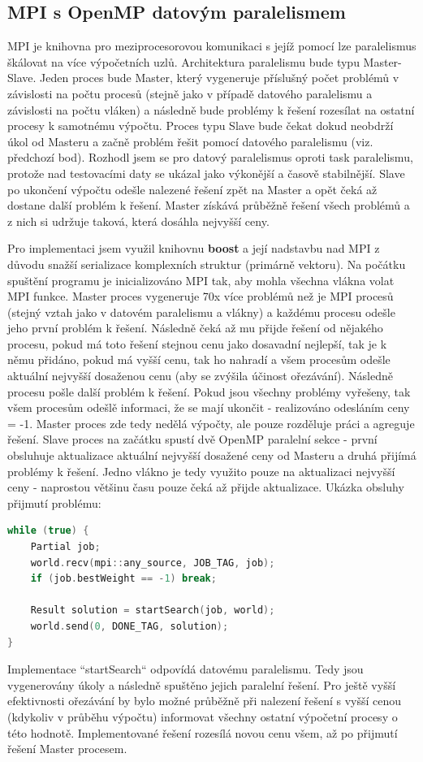 \documentclass{article}%
\begin{document}
\subsection{MPI s OpenMP datovým paralelismem}
MPI je knihovna pro meziprocesorovou komunikaci s jejíž pomocí lze paralelismus škálovat na více výpočetních uzlů. Architektura paralelismu bude typu Master-Slave. Jeden proces bude Master, který vygeneruje příslušný počet problémů v závislosti na počtu procesů (stejně jako v případě datového paralelismu a závislosti na počtu vláken) a následně bude problémy k řešení rozesílat na ostatní procesy k samotnému výpočtu. Proces typu Slave bude čekat dokud neobdrží úkol od Masteru a začně problém řešit pomocí datového paralelismu (viz. předchozí bod). Rozhodl jsem se pro datový paralelismus oproti task paralelismu, protože nad testovacími daty se ukázal jako výkonější a časově stabilnější. Slave po ukončení výpočtu odešle nalezené řešení zpět na Master a opět čeká až dostane další problém k řešení. Master získává průběžně řešení všech problémů a z nich si udržuje taková, která dosáhla nejvyšší ceny.

Pro implementaci jsem využil knihovnu \textbf{boost} a její nadstavbu nad MPI z důvodu snažší serializace komplexních struktur (primárně vektoru). Na počátku spuštění programu je inicializováno MPI tak, aby mohla všechna vlákna volat MPI funkce.
Master proces vygeneruje 70x více problémů než je MPI procesů (stejný vztah jako v datovém paralelismu a vlákny) a každému procesu odešle jeho první problém k řešení. Následně čeká až mu přijde řešení od nějakého procesu, pokud má toto řešení stejnou cenu jako dosavadní nejlepší, tak je k němu přidáno, pokud má vyšší cenu, tak ho nahradí a všem procesům odešle aktuální nejvyšší dosaženou cenu (aby se zvýšila účinost ořezávání). Následně procesu pošle další problém k řešení. Pokud jsou všechny problémy vyřešeny, tak všem procesům odešlě informaci, že se mají ukončit - realizováno odesláním ceny = -1. Master proces zde tedy nedělá výpočty, ale pouze rozděluje práci a agreguje řešení.
Slave proces na začátku spustí dvě OpenMP paralelní sekce - první obsluhuje aktualizace aktuální nejvyšší dosažené ceny od Masteru a druhá přijímá problémy k řešení. Jedno vlákno je tedy využito pouze na aktualizaci nejvyšší ceny - naprostou většinu času pouze čeká až přijde aktualizace. Ukázka obsluhy přijmutí problému:
\begin{lstlisting}[language=c++]
while (true) {
    Partial job;
    world.recv(mpi::any_source, JOB_TAG, job);
    if (job.bestWeight == -1) break;

    Result solution = startSearch(job, world);
    world.send(0, DONE_TAG, solution);
}
\end{lstlisting}
Implementace ``startSearch`` odpovídá datovému paralelismu. Tedy jsou vygenerovány úkoly a následně spuštěno jejich paralelní řešení. Pro ještě vyšší efektivnosti ořezávání by bylo možné průběžně při nalezení řešení s vyšší cenou (kdykoliv v průběhu výpočtu) informovat všechny ostatní výpočetní procesy o této hodnotě. Implementované řešení rozesílá novou cenu všem, až po přijmutí řešení Master procesem.
\end{document}

